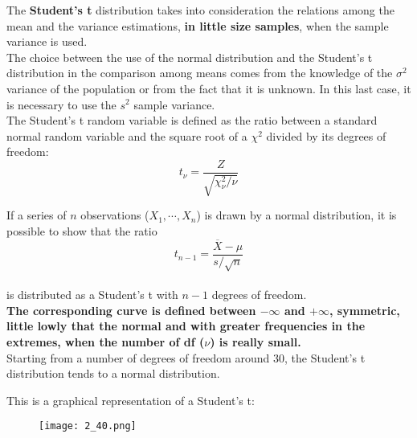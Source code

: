 \begin{frame}
  \vspace*{.3cm}
  The \textbf{Student's t} distribution takes into consideration the relations among the mean and the variance estimations, \textbf{in little size samples}, when the sample variance is used.\\
  \vspace*{.3cm}
  The choice between the use of the normal distribution and the Student's t distribution in the comparison among means comes from the knowledge of the $ \sigma^2 $ variance of the population or from the fact that it is unknown. In this last case, it is necessary to use the $ s^2 $ sample variance.\\
  \vspace*{.3cm}
  The Student's t random variable is defined as the ratio between a standard normal random variable and the square root of a $ \chi^2 $ divided by its degrees of freedom:
  $$ t_\nu = \frac{Z}{\sqrt{\chi^2_\nu/\nu}} $$
\end{frame}

\begin{frame}
  If a series of $ n $ observations ($ X_1, \cdots , X_n $) is drawn by a normal distribution, it is possible to show that the ratio
  \vspace*{.2cm}
  $$t_{n-1}=\frac{\overline{X}-\mu}{s/\sqrt{n}}$$\\
  \vspace*{.2cm}
  is distributed as a Student's t with $ n - 1 $ degrees of freedom. \\
  \vspace*{.5cm}
  \textbf{The corresponding curve is defined between $-\infty$ and $+\infty$, symmetric, little lowly that the normal and with greater frequencies in the extremes, when the number of df ({\boldmath $ \nu $}) is really small.}\\
  \vspace*{.5cm}
  Starting from a number of degrees of freedom around 30, the Student's t distribution tends to a normal distribution.
\end{frame}

\begin{frame}
  \vspace*{.5cm}
  \centering
  This is a graphical representation of a Student's t:\\
  \begin{figure}
    \texttt{[image: 2\_40.png]}
  \end{figure}
\end{frame}

